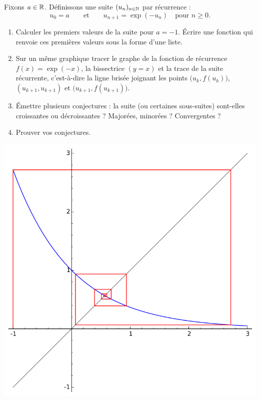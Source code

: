 \begin{frame}
\begin{tp}
Fixons $a\in\mathbb{R}$. Définissons une suite $(u_n)_{n\in\mathbb{N}}$ par récurrence :
$$u_0 = a \qquad \text{et} \qquad u_{n+1} = \exp(-u_n) \quad \text{pour } n\ge 0.$$

\vspace*{-2ex}
\begin{enumerate}\pause
  \item Calculer les premiers valeurs de la suite pour $a=-1$. 
  \'Ecrire une fonction qui renvoie ces premières valeurs sous la forme d'une liste.\pause
  \item Sur un même graphique tracer le graphe de la fonction de récurrence $f(x) = \exp(-x)$, la bissectrice $(y=x)$
  et la trace de la suite récurrente, c'est-à-dire la ligne brisée 
  joignant les points $\big(u_k,f(u_k)\big)$, $(u_{k+1},u_{k+1})$ et $\big(u_{k+1},f(u_{k+1})\big)$.\pause

 \item \'Emettre plusieurs conjectures : la suite (ou certaines sous-suites) sont-elles croissantes ou décroissantes ? Majorées, minorées ? Convergentes ?
  \pause
  \item Prouver vos conjectures.
\end{enumerate}

\end{tp}

\end{frame}


\begin{frame}
\begin{center}
\includegraphics[scale=0.55]{figures/suites-visual1}
\end{center}
\end{frame}

